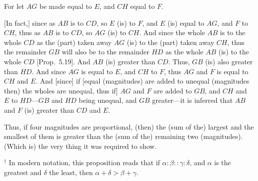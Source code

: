 \begin{Parallel}{}{}
{For let $AG$ be made equal to $E$, and $CH$ equal to $F$.

\mbox{[}In fact,] since as $AB$ is to $CD$, so $E$ (is) to $F$, and $E$ (is) equal to $AG$, and
$F$ to $CH$,  thus as $AB$ is to $CD$, so $AG$ (is) to $CH$. And since the whole
$AB$ is to the whole $CD$ as the (part) taken away $AG$ (is) to the
(part) taken away $CH$, thus the remainder $GB$ will also be to the
remainder $HD$ as the whole $AB$ (is) to the whole $CD$ [Prop.~5.19]. And $AB$ (is) greater than $CD$.
Thus, $GB$ (is) also greater than $HD$. And since $AG$ is equal to $E$, and $CH$
to $F$, thus $AG$ and $F$ is equal to $CH$ and $E$. And [since] if [equal (magnitudes)
are added to unequal (magnitudes then) the wholes are unequal, thus if] $AG$ and $F$ are added to $GB$, and $CH$ and
$E$ to $HD$---$GB$ and
$HD$ being unequal, and $GB$ greater---it is inferred that $AB$ and $F$ (is) greater than $CD$ and $E$.

Thus, if four magnitudes are proportional, (then) the (sum of the)
largest  and the smallest of them is greater than the (sum of the) remaining two (magnitudes). (Which is) the very thing it was required to show.}
\end{Parallel}
{\footnotesize \noindent$^\dag$ In modern notation, this proposition
reads that if $\alpha:\beta::\gamma:\delta$, and $\alpha$ is the greatest and $\delta$ the least, then $\alpha+\delta>\beta+\gamma$.}

\newpage~\thispagestyle{empty}
